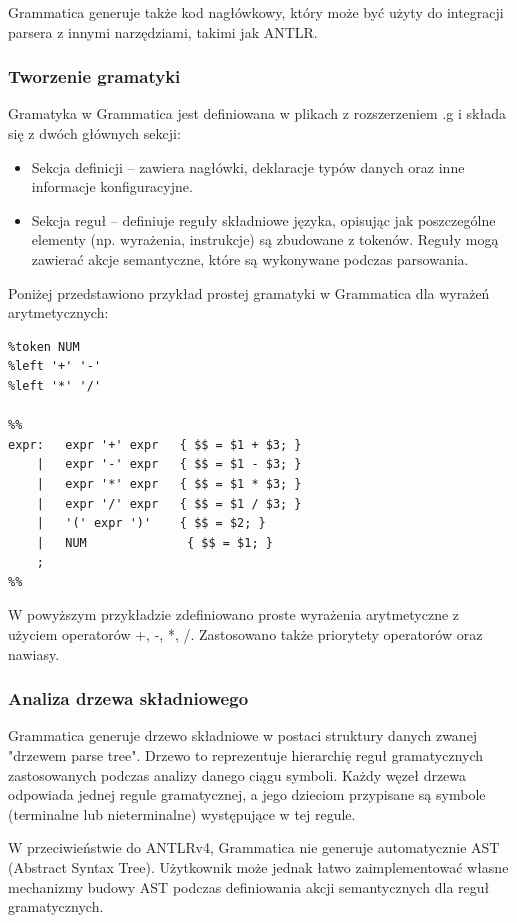 \documentclass[12pt,twoside]{article}
\begin{document}
Grammatica generuje także kod nagłówkowy, który może być użyty do integracji parsera z innymi narzędziami, takimi jak ANTLR.

\subsubsection{Tworzenie gramatyki}
Gramatyka w Grammatica jest definiowana w plikach z rozszerzeniem .g i składa się z dwóch głównych sekcji:
\begin{itemize}[label=\textbullet, leftmargin=1.25cm]
   \item Sekcja definicji -- zawiera nagłówki, deklaracje typów danych oraz inne informacje konfiguracyjne.
   \item Sekcja reguł -- definiuje reguły składniowe języka, opisując jak poszczególne elementy (np. wyrażenia, instrukcje) są zbudowane z tokenów. Reguły mogą zawierać akcje semantyczne, które są wykonywane podczas parsowania.
\end{itemize}

Poniżej przedstawiono przykład prostej gramatyki w Grammatica dla wyrażeń arytmetycznych:
\begin{verbatim}
%token NUM
%left '+' '-'
%left '*' '/'

%%
expr:   expr '+' expr   { $$ = $1 + $3; }
    |   expr '-' expr   { $$ = $1 - $3; }
    |   expr '*' expr   { $$ = $1 * $3; }
    |   expr '/' expr   { $$ = $1 / $3; }
    |   '(' expr ')'    { $$ = $2; }
    |   NUM              { $$ = $1; }
    ;
%%
\end{verbatim}

W powyższym przykładzie zdefiniowano proste wyrażenia arytmetyczne z użyciem operatorów +, -, *, /. Zastosowano także priorytety operatorów oraz nawiasy.

\subsubsection{Analiza drzewa składniowego}
Grammatica generuje drzewo składniowe w postaci struktury danych zwanej "drzewem parse tree". Drzewo to reprezentuje hierarchię reguł gramatycznych zastosowanych podczas analizy danego ciągu symboli. Każdy węzeł drzewa odpowiada jednej regule gramatycznej, a jego dzieciom przypisane są symbole (terminalne lub nieterminalne) występujące w tej regule.

W przeciwieństwie do ANTLRv4, Grammatica nie generuje automatycznie AST (Abstract Syntax Tree). Użytkownik może jednak łatwo zaimplementować własne mechanizmy budowy AST podczas definiowania akcji semantycznych dla reguł gramatycznych.
\end{document}
